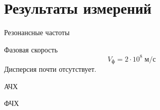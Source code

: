 \section{Результаты измерений}
\begin{figure}[ht!]
\end{figure}
\begin{figure}[ht!]
\end{figure}

\begin{table}[!ht]
    \centering
    \caption{Резонансные частоты}
    
\end{table}

Фазовая скорость
\[
    V_{\text{ф}} = 2\cdot 10^{8}\;\text{м} / \text{с}
\]
Дисперсия почти отсутствует.

\begin{table}[!ht]
    \centering
    \caption{АЧХ}
    
\end{table}

\begin{table}[!ht]
    \centering
    \caption{ФЧХ}
    
\end{table}

